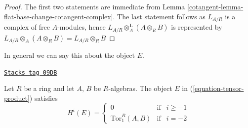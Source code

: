 \begin{proof}

The first two statements are immediate from
Lemma \ref{cotangent-lemma-flat-base-change-cotangent-complex}.
The last statement follows as $L_{A/R}$ is a complex
of free $A$-modules, hence $L_{A/R} \otimes_A^\mathbf{L} (A \otimes_R B)$
is represented by
$L_{A/R} \otimes_A (A \otimes_R B) = L_{A/R} \otimes_R B$
\end{proof}

In general we can say this about the object $E$.

\begin{lemma}
\label{cotangent-lemma-tensor-product}
\href{https://stacks.math.columbia.edu/tag/09DB}{\texttt{Stacks tag 09DB}}

Let $R$ be a ring and let $A$, $B$ be $R$-algebras. The object $E$
in (\ref{equation-tensor-product}) satisfies
$$
H^i(E) =
\left\{
\begin{matrix}
0 & \text{if} & i \geq -1 \\
\text{Tor}_1^R(A, B) & \text{if} & i = -2
\end{matrix}
\right.
$$
\end{lemma}

